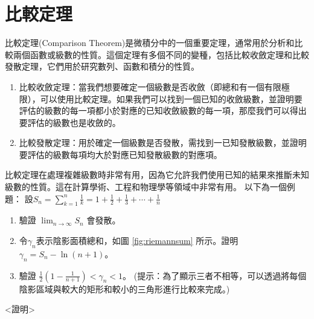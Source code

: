 \documentclass[12pt, a4paper]{article}
\begin{document}
\section{比較定理}
比較定理(Comparison Theorem)是微積分中的一個重要定理，通常用於分析和比較兩個函數或級數的性質。這個定理有多個不同的變種，包括比較收斂定理和比較發散定理，它們用於研究數列、函數和積分的性質。
\begin{enumerate}
\item 比較收斂定理：當我們想要確定一個級數是否收斂（即總和有一個有限極限），可以使用比較定理。如果我們可以找到一個已知的收斂級數，並證明要評估的級數的每一項都小於對應的已知收斂級數的每一項，那麼我們可以得出要評估的級數也是收斂的。
\item 比較發散定理：用於確定一個級數是否發散，需找到一已知發散級數，並證明要評估的級數每項均大於對應已知發散級數的對應項。
\end{enumerate}
比較定理在處理複雜級數時非常有用，因為它允許我們使用已知的結果來推斷未知級數的性質。這在計算學術、工程和物理學等領域中非常有用。
以下為一個例題：
設$S_n=\sum_{k=1}^{n} \frac{1}{k}=1+\frac{1}{2}+\frac{1}{3}+\cdots+\frac{1}{n}$
\begin{enumerate}
\item 驗證 $\lim_{n\rightarrow \infty} S_n$ 會發散。
\item 令$\gamma_n$表示陰影面積總和，如圖 \ref{fig:riemannsum} 所示。證明$\gamma_n=S_n-\ln (n+1)$。
\item 驗證 $\frac{1}{2}(1-\frac{1}{n+1})<\gamma_n < 1$。 
(提示：為了顯示三者不相等，可以透過將每個陰影區域與較大的矩形和較小的三角形進行比較來完成。)
\end{enumerate}
<證明>
\end{document}
